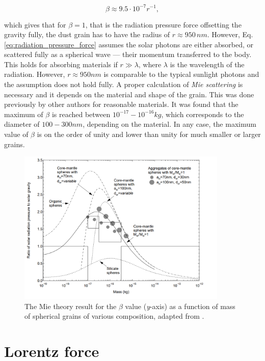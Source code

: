 \begin{equation}
    \beta \approx 9.5 \cdot 10^{-7} r^{-1},
    \label{eq:beta_estimate}
\end{equation}

which gives that for $\beta = 1$, that is the radiation pressure force offsetting the gravity fully, the dust grain has to have the radius of $r \approx 950 \, \si{nm}$. However, Eq. \eqref{eq:radiation_pressure_force} assumes the solar photons are either absorbed, or scattered fully as a spherical wave --- their momentum transferred to the body. This holds for absorbing materials if $r \gg \lambda$, where $\lambda$ is the wavelength of the radiation. However, $r \approx 950 \si{nm}$ is comparable to the typical sunlight photons and the assumption does not hold fully. A proper calculation of \textit{Mie scattering} is necessary and it depends on the material and shape of the grain. This was done previously by other authors \cite{kimura2003composition} for reasonable materials. It was found that the maximum of $\beta$ is reached between $10^{-17} - 10^{-16} \si{kg}$, which corresponds to the diameter of $100 - 300 \si{nm}$, depending on the material. In any case, the maximum value of $\beta$ is on the order of unity and lower than unity for much smaller or larger grains.

\begin{figure}[h]
 	\centering
 	\includegraphics[width=10cm]{figures/kimurra_mie.png}
 	\caption{The Mie theory result for the $\beta$ value (\textit{y}-axis) as a function of mass of spherical grains of various composition, adapted from \cite{kimura2003composition}.}
 	\label{fig:kimura_mie}
\end{figure}

\section{Lorentz force}

